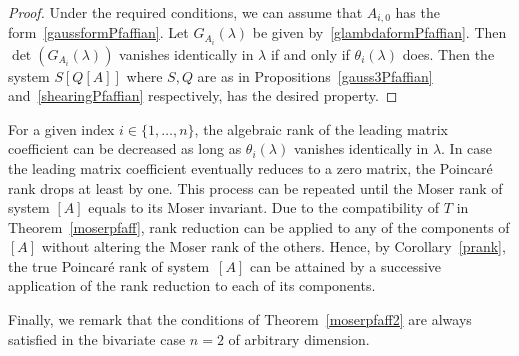 \documentclass[final,1p,times,number,amsthm]{elsart}
\begin{document}
\begin{proof}
Under the required conditions, we can assume that $A_{i,0} $ has the
  form~\eqref{gaussformPfaffian}. Let $G_{A_{i}} (\lambda)$ be given by~\eqref{glambdaformPfaffian}. Then
  $\det(G_{A_{i}} (\lambda))$ vanishes identically in $\lambda$ if and only
  if $\theta_i(\lambda)$ does. Then the system $S[Q[A]]$ where
  $S, Q$ are as in Propositions~\ref{gauss3Pfaffian} and~\ref{shearingPfaffian}
  respectively, has the desired property.
\end{proof}
For a given index $i\in\{1,\dots,n\}$, the algebraic rank of the leading matrix coefficient can be decreased as long as $\theta_{i} (\lambda) $ vanishes
identically in $\lambda$. In case the leading matrix coefficient eventually
reduces to a zero matrix, the Poincar\'e rank drops at least by one. This
process can be repeated until the Moser rank of system $[A]$ equals to its Moser
invariant. Due to the compatibility of $T$ in Theorem~\ref{moserpfaff}, rank
reduction can be applied to any of the components of $[A]$ without altering the
Moser rank of the others. Hence, by Corollary~\ref{prank}, the true Poincar\'e
rank of system~$[A]$ can be attained by a successive application of the rank
reduction to each of its components.

Finally, we remark that the conditions of Theorem~\ref{moserpfaff2} are always satisfied in the bivariate case $n=2$ of arbitrary dimension.
\end{document}
